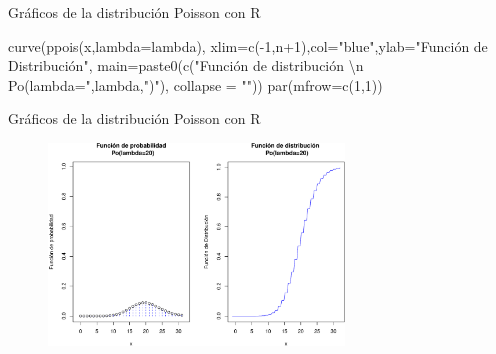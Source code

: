 \documentclass[
  ignorenonframetext,
  aspectratio=169]{beamer}
\newenvironment{Shaded}{\begin{snugshade}}{\end{snugshade}}
\newcommand{\AttributeTok}[1]{\textcolor[rgb]{0.40,0.45,0.13}{#1}}
\newcommand{\DecValTok}[1]{\textcolor[rgb]{0.68,0.00,0.00}{#1}}
\newcommand{\FunctionTok}[1]{\textcolor[rgb]{0.28,0.35,0.67}{#1}}
\newcommand{\NormalTok}[1]{\textcolor[rgb]{0.00,0.23,0.31}{#1}}
\newcommand{\SpecialCharTok}[1]{\textcolor[rgb]{0.37,0.37,0.37}{#1}}
\newcommand{\StringTok}[1]{\textcolor[rgb]{0.13,0.47,0.30}{#1}}
\begin{document}
\begin{frame}[fragile]{Gráficos de la distribución Poisson con R}
\begin{Shaded}
\begin{Highlighting}[]
\FunctionTok{curve}\NormalTok{(}\FunctionTok{ppois}\NormalTok{(x,}\AttributeTok{lambda=}\NormalTok{lambda),}
      \AttributeTok{xlim=}\FunctionTok{c}\NormalTok{(}\SpecialCharTok{{-}}\DecValTok{1}\NormalTok{,n}\SpecialCharTok{+}\DecValTok{1}\NormalTok{),}\AttributeTok{col=}\StringTok{"blue"}\NormalTok{,}\AttributeTok{ylab=}\StringTok{"Función de Distribución"}\NormalTok{,}
      \AttributeTok{main=}\FunctionTok{paste0}\NormalTok{(}\FunctionTok{c}\NormalTok{(}\StringTok{"Función de distribución }\SpecialCharTok{\textbackslash{}n}\StringTok{ Po(lambda="}\NormalTok{,lambda,}\StringTok{")"}\NormalTok{),}
                  \AttributeTok{collapse =} \StringTok{""}\NormalTok{))}
\FunctionTok{par}\NormalTok{(}\AttributeTok{mfrow=}\FunctionTok{c}\NormalTok{(}\DecValTok{1}\NormalTok{,}\DecValTok{1}\NormalTok{))}
\end{Highlighting}
\end{Shaded}
\end{frame}

\begin{frame}{Gráficos de la distribución Poisson con R}
\protect\hypertarget{gruxe1ficos-de-la-distribuciuxf3n-poisson-con-r-1}{}
\begin{figure}

{\centering \includegraphics[width=0.7\textwidth,height=\textheight]{Tema_3_1_Notables_files/figure-beamer/graficosPOISON-1.pdf}

}

\end{figure}
\end{frame}
\end{document}
